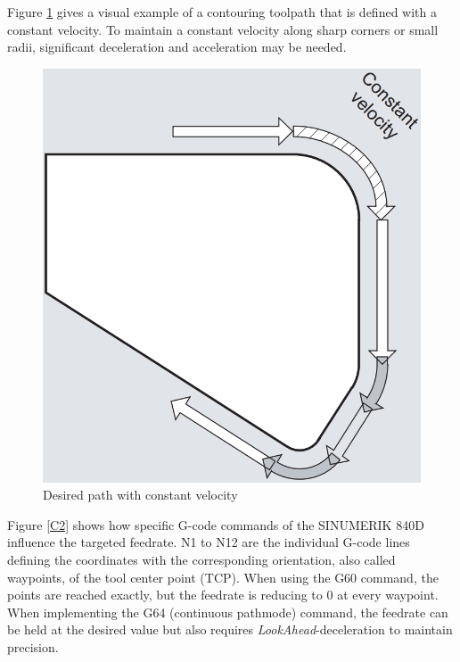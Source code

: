 Figure \ref{C1} gives a visual example of a contouring toolpath that is defined with a constant velocity. To maintain a constant velocity along sharp corners or small radii, significant deceleration and acceleration may be needed. 


 \begin{figure}[H]
 	\centerline{\includegraphics[scale=.3]{figures/conti.png}}
 	\caption{Desired path with constant velocity~\cite{sinumericmanual}}
 	\label{C1}
 \end{figure}

Figure \ref{C2} shows how specific G-code commands of the SINUMERIK 840D influence the targeted feedrate. N1 to N12 are the individual G-code lines defining the coordinates with the corresponding orientation, also called waypoints, of the tool center point (\acrshort{TCP}).  When using the G60 command, the points are reached exactly, but the feedrate is reducing to 0 at every waypoint. When implementing the G64 (continuous pathmode) command, the feedrate can be held at the desired value but also requires \textit{LookAhead}-deceleration to maintain precision.
 

